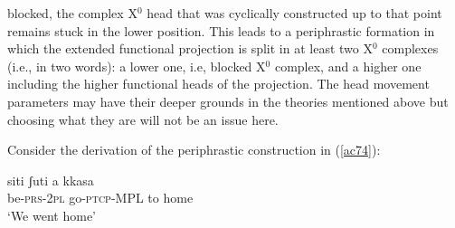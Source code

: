 \documentclass[output=paper]{langscibook}
\begin{document}
blocked, the complex X$^0$ head that was cyclically constructed up to that point remains stuck in the lower position. This leads to a periphrastic formation in which the extended functional projection is split in at least two X$^0$ complexes (i.e., in two words): a lower one, i.e, blocked X$^0$ complex, and a higher one including the higher functional heads of the projection. The head movement parameters may have their deeper grounds in the theories mentioned above but choosing what they are will not be an issue here.

Consider the derivation of the periphrastic construction in (\ref{ac74}):

\ea \label{ac74}\gll siti    ʃuti        a   kkasa\\
   be-\textsc{prs}-\textsc{2pl}  go-\textsc{ptcp}-MPL  to  home\\
   \glt ‘We went home’
\z
\end{document}
